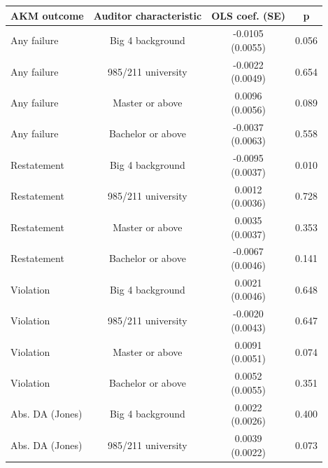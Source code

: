 \documentclass[10pt]{article}
\begin{document}
\begin{minipage}{19cm}\fontsize{10}{12}\selectfont\setlength{\tabcolsep}{4pt}\renewcommand{\arraystretch}{1.12}


\centering
{}
\begin{threeparttable}
\begin{tabular}{p{}ccc}
\toprule
AKM outcome & Auditor characteristic & OLS coef. (SE) & p \\
\midrule
Any failure & Big 4 background & \shortstack{-0.0105\\(0.0055)} & 0.056 \\
Any failure & 985/211 university & \shortstack{-0.0022\\(0.0049)} & 0.654 \\
Any failure & Master or above & \shortstack{0.0096\\(0.0056)} & 0.089 \\
Any failure & Bachelor or above & \shortstack{-0.0037\\(0.0063)} & 0.558 \\
Restatement & Big 4 background & \shortstack{-0.0095\\(0.0037)} & 0.010 \\
Restatement & 985/211 university & \shortstack{0.0012\\(0.0036)} & 0.728 \\
Restatement & Master or above & \shortstack{0.0035\\(0.0037)} & 0.353 \\
Restatement & Bachelor or above & \shortstack{-0.0067\\(0.0046)} & 0.141 \\
Violation & Big 4 background & \shortstack{0.0021\\(0.0046)} & 0.648 \\
Violation & 985/211 university & \shortstack{-0.0020\\(0.0043)} & 0.647 \\
Violation & Master or above & \shortstack{0.0091\\(0.0051)} & 0.074 \\
Violation & Bachelor or above & \shortstack{0.0052\\(0.0055)} & 0.351 \\
Abs. DA (Jones) & Big 4 background & \shortstack{0.0022\\(0.0026)} & 0.400 \\
Abs. DA (Jones) & 985/211 university & \shortstack{0.0039\\(0.0022)} & 0.073 \\

\end{tabular}
\end{threeparttable}
\end{minipage}
\end{document}
